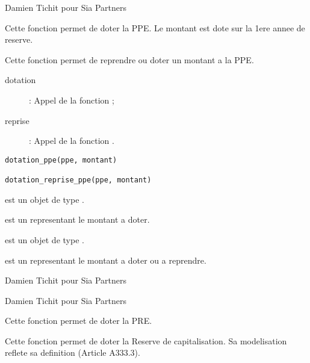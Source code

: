 \documentclass[a4paper]{book}
\begin{document}
%
\begin{Author}\relax
Damien Tichit pour Sia Partners
\end{Author}
%
\begin{Description}\relax
Cette fonction permet de doter la PPE. Le montant est dote sur la 1ere annee de reserve.

Cette fonction permet de reprendre ou doter un montant a la PPE.
\begin{description}

\item[dotation]  : Appel de la fonction  ;
\item[reprise]  : Appel de la fonction .

\end{description}

\end{Description}
%
\begin{Usage}
\begin{verbatim}
dotation_ppe(ppe, montant)

dotation_reprise_ppe(ppe, montant)
\end{verbatim}
\end{Usage}
%
\begin{Arguments}
\begin{ldescription}
\item[\code{ppe}] est un objet de type .

\item[\code{montant}] est un  representant le montant a doter.

\item[\code{ppe}] est un objet de type .

\item[\code{montant}] est un  representant le montant a doter ou a reprendre.
\end{ldescription}
\end{Arguments}
%
\begin{Author}\relax
Damien Tichit pour Sia Partners

Damien Tichit pour Sia Partners
\end{Author}
%
\begin{Description}\relax
Cette fonction permet de doter la PRE.

Cette fonction permet de doter la Reserve de capitalisation. Sa modelisation reflete sa definition (Article A333.3).
\end{Description}
\end{document}
